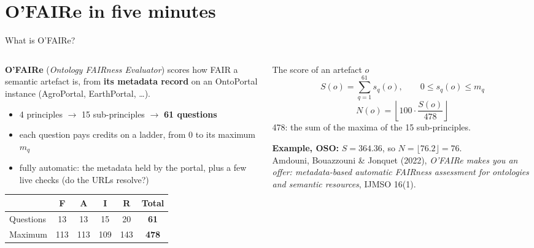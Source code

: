 \documentclass[aspectratio=169,10pt]{beamer}
\newcommand{\evidence}[1]{{\scriptsize\color{dtgrey}#1}}
\begin{document}
\section{O'FAIRe in five minutes}

\begin{frame}{What is O'FAIRe?}
  \begin{columns}[T]
    \begin{column}{0.52\textwidth}
      \small
      \textbf{O'FAIRe} (\emph{Ontology FAIRness Evaluator}) scores how FAIR a semantic artefact is,
      from \textbf{its metadata record} on an OntoPortal instance (AgroPortal, EarthPortal, \dots).
      \begin{itemize}
        \item 4 principles $\rightarrow$ 15 sub-principles $\rightarrow$ \textbf{61 questions}
        \item each question pays credits on a ladder, from 0 to its maximum $m_q$
        \item fully automatic: the metadata held by the portal, plus a few live checks (do the URLs resolve?)
      \end{itemize}
      \vspace{2pt}
      \scriptsize
      \begin{tabular}{@{}l c c c c | c@{}}
        \toprule
        & F & A & I & R & \textbf{Total}\\
        \midrule
        Questions & 13 & 13 & 15 & 20 & \textbf{61}\\
        Maximum & 113 & 113 & 109 & 143 & \textbf{478}\\
        \bottomrule
      \end{tabular}
    \end{column}
    \begin{column}{0.45\textwidth}
      \begin{block}{The score of an artefact $o$}
        \vspace{-6pt}
        \[
          S(o) = \sum_{q=1}^{61} s_q(o), \qquad 0 \le s_q(o) \le m_q
        \]
        \vspace{-4pt}
        \[
          N(o) = \left\lfloor 100 \cdot \frac{S(o)}{478} \right\rfloor
        \]
        {\scriptsize 478: the sum of the maxima of the 15 sub-principles.}
      \end{block}
      {\small\textbf{Example, OSO:} $S = 364.36$, so $N = \lfloor 76.2 \rfloor = 76$.}\\[6pt]
      \evidence{Amdouni, Bouazzouni \& Jonquet (2022), \emph{O'FAIRe makes you an offer: metadata-based
      automatic FAIRness assessment for ontologies and semantic resources}, IJMSO 16(1).}
    \end{column}
  \end{columns}
\end{frame}
\end{document}
